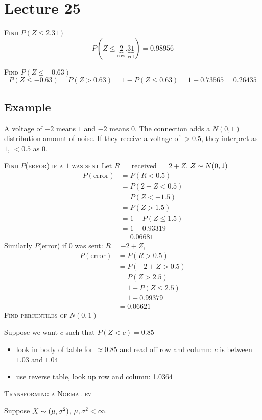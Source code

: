 \section{Lecture 25}
\textsc{Find $ P(Z\le 2.31) $}
\[ P(Z\le \underbrace{2}_{\text{row}}.\underbrace{31}_{\text{col}})=0.98956 \]

\textsc{Find $ P(Z\le-0.63) $}
\[ P(Z\le-0.63)=P(Z>0.63)=1-P(Z\le 0.63)=1-0.73565=0.26435\]

\subsection{Example}
A voltage of $ +2 $ means $ 1 $ and $ -2 $ means $ 0 $. The connection
adds a $ N(0,1) $ distribution amount of noise. If they receive a voltage of
$ >0.5 $, they interpret as $ 1 $, $ <0.5 $ as $ 0 $.

\textsc{Find $ P $(error) if a $ 1 $ was sent}
Let $ R = $ received $ =2+Z $. $ Z \thicksim N(0,1) $
\begin{align*}
    P(\text{error})&=P(R<0.5)\\
    &=P(2+Z<0.5)\\
    &=P(Z<-1.5)\\
    &=P(Z> 1.5)\\
    &=1-P(Z\le 1.5)\\
    &=1-0.93319\\
    &=0.06681
\end{align*}
Similarly $ P $(error) if $ 0 $ was sent: $ R=-2+Z $,
\begin{align*}
    P(\text{error})&=P(R>0.5)\\
    &=P(-2+Z>0.5)\\
    &=P(Z>2.5)\\
    &=1-P(Z\le 2.5)\\
    &=1-0.99379\\
    &=0.06621
\end{align*}
\textsc{Find percentiles of $ N(0,1) $}

Suppose we want $ c $ such that $ P(Z<c)=0.85 $
\begin{itemize}
    \item look in body of table for $ \approx 0.85 $ and read off row and column: $ c $ is between $ 1.03 $ and $ 1.04 $
    \item use reverse table, look up row and column: 1.0364
\end{itemize}

\textsc{Transforming a Normal rv}

Suppose $ X \thicksim (\mu,\sigma^2) $, $ \mu,\sigma^2<\infty $.

